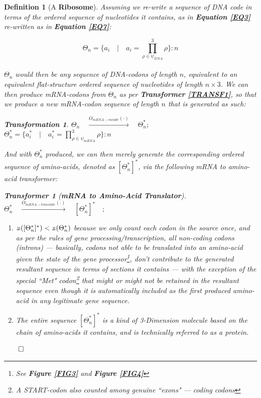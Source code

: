 \documentclass[a4paper, 18pt]{book} %
\newtheorem{defn}{Definition}
\newtheorem{trans}{Transformation}
\newtheorem{transf}{Transformer}
\newcommand{\invpi}{\rotatebox[origin=c]{180}{$\pi$}}
\begin{document}
\begin{defn}[A \textbf{Ribosome}]
\label{DEFRIBOSOME}
Assuming we re-write a sequence of DNA code in terms of the ordered sequence of nucleotides it contains, as in \textbf{Equation \ref{EQ3}} re-written as in \textbf{Equation \ref{EQ7}}:

 \begin{equation}
\label{EQ7}
\Theta_n = \{a_i \quad | \quad a_i = \prod\limits_{\rho \in \psi_{DNA}}^3 \rho \}:n
\end{equation}\\

$\Theta_n$ would then be any sequence of DNA-codons of length $n$, equivalent to an equivalent flat-structure ordered sequence of nucleotides of length $n \times 3$. We can then produce mRNA-codons from $\Theta_n$ as per \textbf{Transformer \ref{TRANSF1}}, so that we produce a new mRNA-codon sequence of length $n$ that is generated as such:

\begin{trans}
\label{TRANS1}
$\Theta_n \quad \xrightarrow{O_{mRNA-encode}(\cdot)} \quad \Theta^*_n;$\\
$\Theta^*_n = \{a_i^* \quad | \quad a_i^* = \prod\limits_{\rho \in \psi_{mRNA}}^3 \rho \}:n$
\end{trans}

And with $\Theta^*_n$ produced, we can then merely generate the corresponding ordered sequence of amino-acids, denoted as $[\Theta^*_n]^*$, via the following mRNA to amino-acid transformer: 

\begin{transf}[\textbf{mRNA to Amino-Acid Translator}]
\label{TRANSF2}
$\Theta^*_n \quad \xrightarrow{O_{mRNA-translate}(\cdot)} \quad [\Theta^*_n]^* \quad;$\\
\begin{enumerate}
\item $\invpi([\Theta^*_n]^*) < \invpi(\Theta^*_n)$ because we only count each codon in the source once, and as per the rules of gene processing/transcription, all non-coding codons (introns) --- basically, codons not able to be translated into an amino-acid given the state of the gene processor\footnote{See \textbf{Figure \ref{FIG3}} and \textbf{Figure \ref{FIG4}}}, don't contribute to the generated resultant sequence in terms of sections it contains --- with the exception of the special ``Met" codon\footnote{A START-codon also counted among genuine ``exons" --- coding codons} that might or might not be retained in the resultant sequence even though it is automatically included as the first produced amino-acid in any legitimate gene sequence.
\item The entire sequence $[\Theta^*_n]^*$ is a kind of 3-Dimension molecule based on the chain of amino-acids it contains, and is technically referred to as a protein.
\end{enumerate}
$\qed$
\end{transf}


\end{defn}
\end{document}
